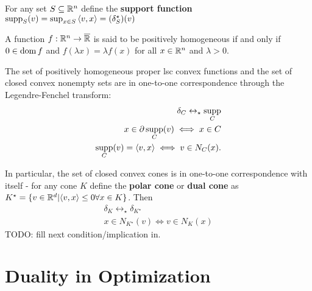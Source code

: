 \begin{defn}
  \label{sec:conjugate-functions-12}
  For any set $S \subseteq \mathbb{R}^{n}$ define the \textbf{support
    function} $\supp_{S}(v) = \sup_{x \in S} \IP{v, x} = (\delta^{\star}_{S})(v)$
\end{defn}

\begin{defn}
  \label{sec:conjugate-functions-13}
  A function $f: \mathbb{R}^{n} \rightarrow \overline {\mathbb{R}}$ is said to be
  positively homogeneous if and only if $0 \in \operatorname*{dom} f$ and $f(\lambda
  x) = \lambda f(x)$ for all $x \in \mathbb{R}^{n}$ and $\lambda > 0$.
\end{defn}

\begin{thm}
  \label{sec:conjugate-functions-14}
  The set of positively homogeneous proper lsc convex functions and the
  set of closed convex nonempty sets are in one-to-one correspondence
  through the Legendre-Fenchel transform:
  \begin{align}
    \label{eq:28}
    \delta_{C} \leftrightarrow_{\star} \supp_{C} \\
    \label{eq:29}
    x \in \partial \supp_{C}(v) \iff x \in C \\
    \label{eq:30}
    \supp_{C}(v) = \IP{v, x} \iff v \in N_{C}(x).
  \end{align}

  In particular, the set of closed convex cones is in one-to-one
  correspondence with itself - for any cone $K$ define the
  \textbf{polar cone} or \textbf{dual cone} as $K^{\star} = \{ v \in
  \R^{d} | \IP{v, x} \leq 0 \forall x \in K \} $.  Then
  \begin{align}
    \label{eq:31}
    \delta_{K} \leftrightarrow_{\star} \delta_{K^{\star}} \\
    \label{eq:32}
    x \in N_{K^{\star}}(v) \iff v \in N_{K}(x) %
  \end{align}
  TODO: fill next condition/implication in.
\end{thm}

\section{Duality in Optimization}
\label{sec:duality-optimization}


